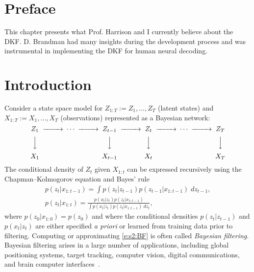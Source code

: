 
\section{Preface}
This chapter presents what Prof. Harrison and I currently believe about the DKF. D. Brandman had many insights during the development process and was instrumental in implementing the DKF for human neural decoding.

\section{Introduction} \label{s:intro}
Consider a state space model for $Z_{1:T}:=Z_1,\dotsc,Z_T$ (latent states) and $X_{1:T}:=X_1,\dotsc,X_T$ (observations) represented as a Bayesian network:
\begin{equation} \label{f:graphical_model}
\begin{CD}
Z_1 @>>> \cdots @>>>  Z_{t-1} @>>> Z_t @>>> \cdots  @>>> Z_T \\
@VVV @.	@VVV @VVV @. @VVV \\
X_1  @. @. X_{t-1} @. X_t @. @. X_T
\end{CD}
\end{equation}
The conditional density of $Z_t$ given $X_{1:t}$ can be expressed recursively using the Chapman--Kolmogorov equation and Bayes' rule~\cite[see][for further details]{Che03}
\begin{subequations} \label{e:s2:BF}
\begin{gather} p(z_t|x_{1:t-1}) = \textstyle \int p(z_t|z_{t-1}) p(z_{t-1}|x_{1:t-1}) \; dz_{t-1} , \label{e:s2:BFa} \\
p(z_t|x_{1:t}) = \frac{p(x_t|z_t)p(z_t|x_{1:t-1})}{\int p(x_t|z_t) p(z_t|x_{1:t-1}) \; dz_t} , \label{e:s2:BFb}
\end{gather}  
\end{subequations}
where $p(z_0|x_{1:0})=p(z_0)$ and where the conditional densities $p(z_t|z_{t-1})$ and $p(x_t|z_t)$ are either specified \emph{a priori} or learned from training data prior to filtering. 
Computing or approximating \eqref{e:s2:BF} is often called {\em Bayesian filtering}. Bayesian filtering arises in a large number of applications, including global positioning systems, target tracking, computer vision, digital communications, and brain computer interfaces~\cite{Che03,Bro12,Bra17}. 

